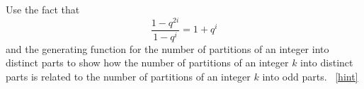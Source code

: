 \documentclass{book}
\begin{document}
\setcounter{project}{324}
\addtocounter{project}{-1}
\begin{activity}[]\label{activity-317}
\hypertarget{p-1645}{}%
Use the fact that%
\begin{equation*}
\frac{1-q^{2i}}{1-q^i}= 1+q^i
\end{equation*}
and the generating function for the number of partitions of an integer into distinct parts to show how the number of partitions of an integer \(k\) into distinct parts is related to the number of partitions of an integer \(k\) into odd parts.%
~\hfill{\tiny\hyperlink{a-324}{[hint]}\hypertarget{q-324}{}}\end{activity}
\end{document}
